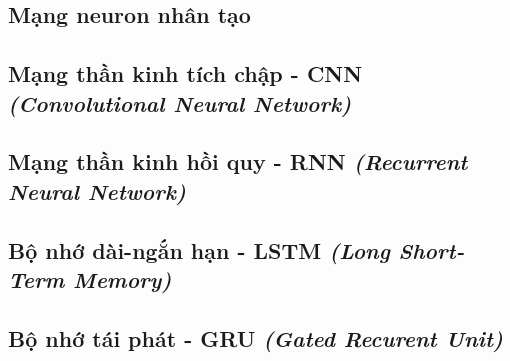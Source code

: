 \subsection{Mạng neuron nhân tạo}


\subsection{Mạng thần kinh tích chập - CNN \textit{(Convolutional Neural Network)}}


\subsection{Mạng thần kinh hồi quy - RNN \textit{(Recurrent Neural Network)}}


\subsection{Bộ nhớ dài-ngắn hạn - LSTM \textit{(Long Short-Term Memory)}}


\subsection{Bộ nhớ tái phát - GRU \textit{(Gated Recurent Unit)}}

